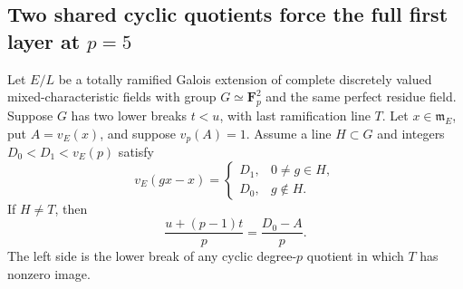 \subsection{Two shared cyclic quotients force the full first layer at \(p=5\)}

\begin{lemma}
\label{lem:B-RD87-coefficient}
Let \(E/L\) be a totally ramified Galois extension of
complete discretely valued mixed-characteristic fields
with group \(G\simeq\mathbf F_p^2\) and the same perfect
residue field. Suppose \(G\) has two lower breaks
\(t<u\), with last ramification line \(T\).
Let \(x\in\mathfrak m_E\), put \(A=v_E(x)\), and
suppose \(v_p(A)=1\). Assume a line \(H\subset G\)
and integers \(D_0<D_1<v_E(p)\) satisfy
\[
 v_E(gx-x)=
 \begin{cases}
  D_1,&0\ne g\in H,\\
  D_0,&g\notin H.
 \end{cases}                                         \tag{B-RD87.1}
\]
If \(H\ne T\), then
\[
     \frac{u+(p-1)t}{p}=\frac{D_0-A}{p}.              \tag{B-RD87.2}
\]
The left side is the lower break of any cyclic
degree-\(p\) quotient in which \(T\) has nonzero image.
\end{lemma}
